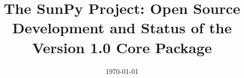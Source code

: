 \documentclass[preprint]{aastex63}
\begin{document}
\title{The SunPy Project: Open Source Development and Status of the Version 1.0 Core Package}


\date{\today}

















\end{document}
